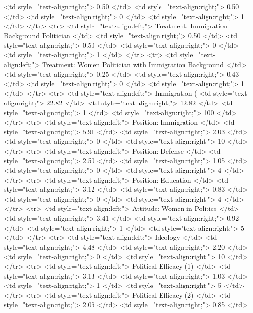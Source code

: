    <td style="text-align:right;"> 0.50 </td>
   <td style="text-align:right;"> 0.50 </td>
   <td style="text-align:right;"> 0 </td>
   <td style="text-align:right;"> 1 </td>
  </tr>
  <tr>
   <td style="text-align:left;"> Treatment: Immigration Background Politician </td>
   <td style="text-align:right;"> 0.50 </td>
   <td style="text-align:right;"> 0.50 </td>
   <td style="text-align:right;"> 0 </td>
   <td style="text-align:right;"> 1 </td>
  </tr>
  <tr>
   <td style="text-align:left;"> Treatment: Women Politician with Immigration Background </td>
   <td style="text-align:right;"> 0.25 </td>
   <td style="text-align:right;"> 0.43 </td>
   <td style="text-align:right;"> 0 </td>
   <td style="text-align:right;"> 1 </td>
  </tr>
  <tr>
   <td style="text-align:left;"> Immigration (%
   <td style="text-align:right;"> 22.82 </td>
   <td style="text-align:right;"> 12.82 </td>
   <td style="text-align:right;"> 1 </td>
   <td style="text-align:right;"> 100 </td>
  </tr>
  <tr>
   <td style="text-align:left;"> Position: Immigration </td>
   <td style="text-align:right;"> 5.91 </td>
   <td style="text-align:right;"> 2.03 </td>
   <td style="text-align:right;"> 0 </td>
   <td style="text-align:right;"> 10 </td>
  </tr>
  <tr>
   <td style="text-align:left;"> Position: Defense </td>
   <td style="text-align:right;"> 2.50 </td>
   <td style="text-align:right;"> 1.05 </td>
   <td style="text-align:right;"> 0 </td>
   <td style="text-align:right;"> 4 </td>
  </tr>
  <tr>
   <td style="text-align:left;"> Position: Education </td>
   <td style="text-align:right;"> 3.12 </td>
   <td style="text-align:right;"> 0.83 </td>
   <td style="text-align:right;"> 0 </td>
   <td style="text-align:right;"> 4 </td>
  </tr>
  <tr>
   <td style="text-align:left;"> Attitude: Women in Politics </td>
   <td style="text-align:right;"> 3.41 </td>
   <td style="text-align:right;"> 0.92 </td>
   <td style="text-align:right;"> 1 </td>
   <td style="text-align:right;"> 5 </td>
  </tr>
  <tr>
   <td style="text-align:left;"> Ideology </td>
   <td style="text-align:right;"> 4.48 </td>
   <td style="text-align:right;"> 2.20 </td>
   <td style="text-align:right;"> 0 </td>
   <td style="text-align:right;"> 10 </td>
  </tr>
  <tr>
   <td style="text-align:left;"> Political Efficacy (1) </td>
   <td style="text-align:right;"> 3.13 </td>
   <td style="text-align:right;"> 1.03 </td>
   <td style="text-align:right;"> 1 </td>
   <td style="text-align:right;"> 5 </td>
  </tr>
  <tr>
   <td style="text-align:left;"> Political Efficacy (2) </td>
   <td style="text-align:right;"> 2.06 </td>
   <td style="text-align:right;"> 0.85 </td>
